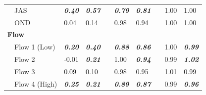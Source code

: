 \documentclass[letterpaper,12pt,oneside]{article}\usepackage[]{graphicx}\usepackage[]{color}
\begin{document}
\begin{table}[!tbp]
\begin{center}
\begin{tabular}{lllcllcll}
~~JAS&{\bf \textit{0.40}}&{\bf \textit{0.57}}&&{\bf \textit{0.79}}&{\bf \textit{0.81}}&&1.00&1.00\tabularnewline
~~OND&0.04&0.14&&0.98&0.94&&1.00&1.00\tabularnewline
\hline
{\bfseries Flow}&&&&&&&&\tabularnewline
~~Flow 1 (Low)&{\bf \textit{0.20}}&{\bf \textit{0.40}}&&{\bf \textit{0.88}}&{\bf \textit{0.86}}&&1.00&{\bf \textit{0.99}}\tabularnewline
~~Flow 2&-0.01&{\bf \textit{0.21}}&&1.00&{\bf \textit{0.94}}&&0.99&{\bf \textit{1.02}}\tabularnewline
~~Flow 3&0.09&0.10&&0.98&0.95&&1.01&0.99\tabularnewline
~~Flow 4 (High)&{\bf \textit{0.25}}&{\bf \textit{0.21}}&&{\bf \textit{0.89}}&{\bf \textit{0.87}}&&0.99&{\bf \textit{0.96}}\tabularnewline
\hline
\end{tabular}\end{center}

\end{table}
\end{document}
